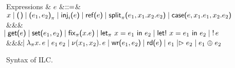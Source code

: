 \begin{figure*}[t]
\begin{comment}
    Affine types
    & $X,Y$
    &$\bnfas$& $\tyRd{S} \bnfalt \tyBang{A} \bnfalt
    \tyTensor{X}{Y}$
    \\
    Affine typings
    & $\Delta$
    &$\bnfas$& $\emptyctxt \bnfalt \Delta,x:X \bnfalt \Delta, \wrtok$
  \end{grammar}
  \end{comment}
  \begin{grammar}
    Expressions
    & $e$
        &$\mathrel{::=}$&
        $\eVar{x} \bnfalt \eUnit \bnfalt \ePair{e_1}{e_2} \bnfalt \eInj{i}{e}
    \bnfalt \eRef{e} \bnfalt \eSplit{e_1}{x_1}{x_2}{e_2} \bnfalt
    \eCase{e}{x_1}{e_1}{x_2}{e_2}$
    \\ &&& $\hspace{-1.02ex}\mathrel{\mid} \text{\textsf{get}}\textsf{(}{e}\textsf{)} \mathrel{\mid} \text{\textsf{set}}\textsf{(}{e_1},{e_2}\textsf{)} \mathrel{\mid} \text{\textsf{fix}}_{\pi}\textsf{(}{x}.{e}\textsf{)}
    \mathrel{\mid} \text{\textsf{let}}_{\pi}\ {x} = {e_1}\ \text{\textsf{in}}\ {e_2} \mathrel{\mid} \text{\textsf{let!}}\ {x} = {e_1}\ \text{\textsf{in}}\ {e_2} \mathrel{\mid} {!}\,{e}$
    \\ &&& $\hspace{-1.02ex}\mathrel{\mid} \lambda_{\pi} {x}.\,{e} \mathrel{\mid} e_1\,e_2
    \mathrel{\mid} \nu(x_1,x_2).\,e \mathrel{\mid} \text{\textsf{wr}}\textsf{(}{e_1},{e_2}\textsf{)}
    \mathrel{\mid} \text{\textsf{rd}}\textsf{(}{e}\textsf{)} \mathrel{\mid} e_1 \mathrel{|\rhd} e_2 \mathrel{\mid} e_1 \mathrel{\oplus} e_2$
  \end{grammar}
  \caption{Syntax of ILC.}
  \label{fig:ilc-syntax}
\end{figure*}
